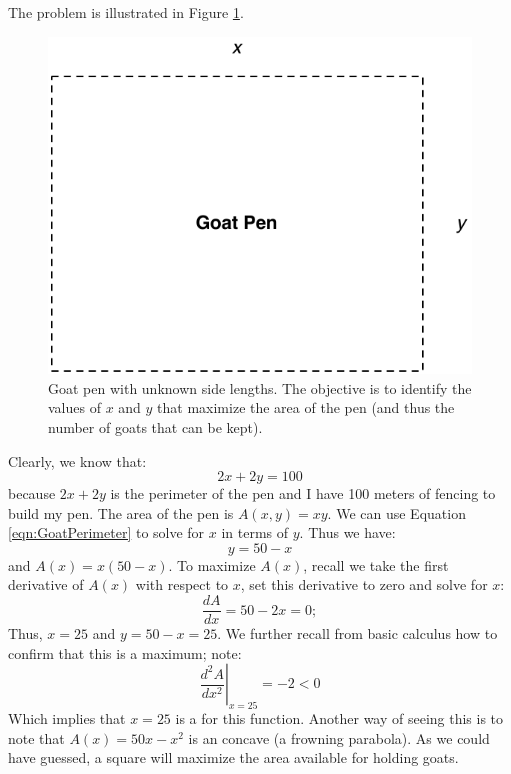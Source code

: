 The problem is illustrated in Figure \ref{fig:GoatPen}.
\begin{figure}[htbp]
\centering
\includegraphics[scale=0.6]{imported_figures/GoatPen.pdf}
\caption{Goat pen with unknown side lengths. The objective is to identify the values of $x$ and $y$ that maximize the area of the pen (and thus the number of goats that can be kept).}
\label{fig:GoatPen}
\end{figure}
Clearly, we know that:
\begin{equation}
2x + 2y = 100
\label{eqn:GoatPerimeter}
\end{equation}
because $2x + 2y$ is the perimeter of the pen and I have 100 meters of fencing to build my pen. The area of the pen is $A(x,y) = xy$. We can use Equation \ref{eqn:GoatPerimeter} to solve for $x$ in terms of $y$. Thus we have:
\begin{equation}
y = 50 - x
\end{equation}
and $A(x) = x(50-x)$. To maximize $A(x)$, recall we take the first derivative of $A(x)$ with respect to $x$, set this derivative to zero and solve for $x$:
\begin{equation}
\frac{dA}{dx} = 50-2x = 0;
\end{equation}
Thus, $x = 25$ and $y = 50-x = 25$. We further recall from basic calculus how to confirm that this is a maximum; note:
\begin{equation}
\left.\frac{d^2A}{dx^2}\right|_{x = 25} = -2 < 0
\end{equation}
Which implies that $x = 25$ is a  for this function. Another way of seeing this is to note that $A(x) = 50x-x^2$ is an concave (a frowning parabola). As we could have guessed, a square will maximize the area available for holding goats. 

